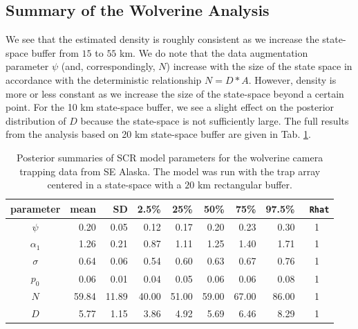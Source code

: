 \subsection{Summary of the Wolverine Analysis}

We see that the estimated density is roughly consistent as we increase
the state-space buffer from $15$ to $55$ km. We do note that the data
augmentation parameter $\psi$ (and, correspondingly, $N$) increase with
the size of the state space in accordance with the deterministic
relationship $N= D*A$. However, density is more or less constant as we
increase the size of the state-space beyond a certain point.  For the
10 km state-space buffer, we see a slight effect on the posterior
distribution of $D$ because the state-space is not sufficiently large.
The full results from the analysis based on 20 km state-space buffer
are given in Tab. \ref{scr0.tab.wolverine-results2}.

\begin{table}
\centering
\caption{
Posterior summaries of SCR model parameters for the wolverine camera
trapping data from SE Alaska. The model was run with the trap array
centered in a state-space with a $20$ km
rectangular buffer.
}
\begin{tabular}{crrrrrrrc}
\hline \hline
parameter & mean & SD & 2.5\% & 25\% & 50\% & 75\% & 97.5\% &\mbox{\tt
  Rhat}  \\
\hline
$\psi$  &      0.20&  0.05&   0.12&   0.17&   0.20&   0.23&   0.30 &   1 \\
$\alpha_1$ &     1.26&  0.21&   0.87&   1.11&   1.25&   1.40&   1.71 &   1 \\
$\sigma$&      0.64&  0.06&   0.54&   0.60&   0.63&   0.67&   0.76 &   1 \\
$p_0$   &      0.06&  0.01&   0.04&   0.05&   0.06&   0.06&   0.08 &   1 \\
$N$    &     59.84& 11.89&  40.00&  51.00&  59.00&  67.00&  86.00 &   1 \\
$D$    &      5.77&  1.15&   3.86&   4.92&   5.69&   6.46&   8.29 &   1 \\
\end{tabular}
\label{scr0.tab.wolverine-results2}
\end{table}

